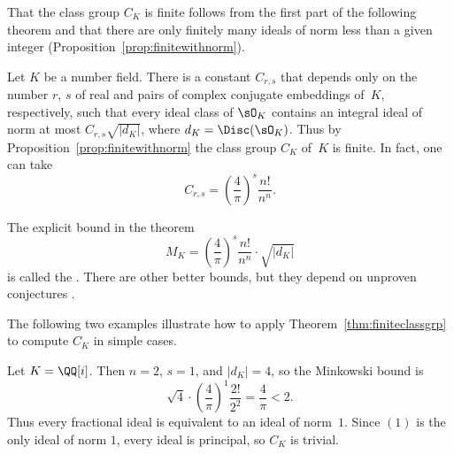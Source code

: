 That the class group $C_K$ is finite follows from the first part of
the following theorem and that there are only finitely many
ideals of norm less than a given integer (Proposition~\ref{prop:finitewithnorm}).
\begin{theorem}\label{thm:finiteclassgrp}
	Let $K$ be a number field.  There is a constant $C_{r,s}$ that
	depends only on the number $r$, $s$ of real and pairs
	of complex conjugate embeddings of~$K$, respectively, such that
	every ideal class of $\sO_K$ contains an integral ideal
	of norm at most $C_{r,s}\sqrt{|d_K|}$, where $d_K=\Disc(\sO_K)$.
	Thus by Proposition~\ref{prop:finitewithnorm}
	the class group $C_K$ of~$K$ is finite. In fact, one can take
	\[
		C_{r,s} = \left(\frac{4}{\pi}\right)^s\frac{n!}{n^n}.
	\]
\end{theorem}
The explicit bound in the theorem
\[
	M_K = \left(\frac{4}{\pi}\right)^s\frac{n!}{n^n} \cdot \sqrt{|d_K|}
\]
is called the .
There are other better bounds, but they depend on unproven conjectures
\cite{bach1990explicit}.

The following two examples illustrate how to apply
Theorem~\ref{thm:finiteclassgrp} to compute $C_K$ in simple cases.
\begin{example}
	Let $K=\QQ[i]$.  Then $n=2$, $s=1$, and $|d_K|=4$, so the Minkowski bound is
	\[
		\sqrt{4} \cdot \left(\frac{4}{\pi}\right)^1 \frac{2!}{2^2}
		= \frac{4}{\pi} < 2.
	\]
	Thus every fractional ideal is equivalent to an ideal of norm~$1$.
	Since $(1)$ is the only ideal of norm $1$, every ideal is principal,
	so $C_K$ is trivial.
\end{example}

